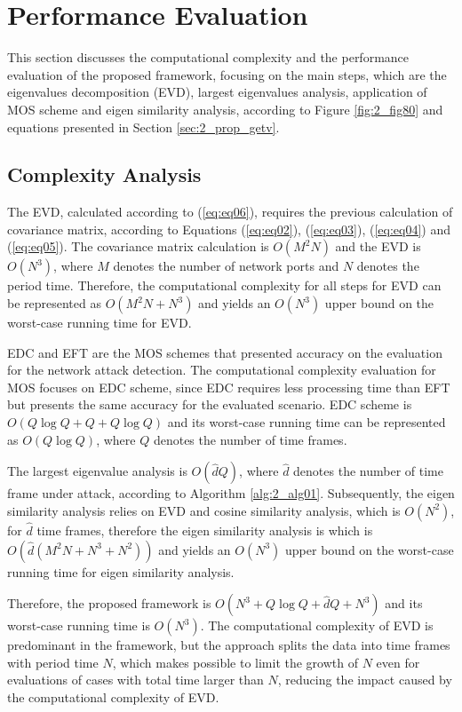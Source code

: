 \section{Performance Evaluation}
\label{sec:2_Complexity}

This section discusses the computational complexity and the performance evaluation of the proposed framework, focusing on the main steps, which are the eigenvalues decomposition (EVD), largest eigenvalues analysis, application of MOS scheme and eigen similarity analysis, according to Figure \ref{fig:2_fig80} and equations presented in Section \ref{sec:2_prop_getv}.

\subsection{Complexity Analysis}
\label{sec:2_ComplexityAnalysis}
The EVD, calculated according to (\ref{eq:eq06}), requires the previous calculation of covariance matrix, according to Equations (\ref{eq:eq02}), (\ref{eq:eq03}), (\ref{eq:eq04}) and (\ref{eq:eq05}). The covariance matrix calculation is $O(M^2N)$ and the EVD is $O(N^3)$, where $M$ denotes the number of network ports and $N$ denotes the period time. Therefore, the computational complexity for all steps for EVD can be represented as $O(M^2N + N^3)$ and yields an $O(N^3)$ upper bound on the worst-case running time for EVD.

EDC and EFT are the MOS schemes that presented accuracy on the evaluation for the network attack detection. The computational complexity evaluation for MOS focuses on EDC scheme, since EDC requires less processing time than EFT but presents the same accuracy for the evaluated scenario. EDC scheme is $O(Q \log Q + Q + Q \log Q)$ and its worst-case running time can be represented as $O(Q \log Q)$, where $Q$ denotes the number of time frames.

The largest eigenvalue analysis is $O(\hat{d}Q)$, where $\hat{d}$ denotes the number of time frame under attack, according to Algorithm \ref{alg:2_alg01}. Subsequently, the eigen similarity analysis relies on EVD and cosine similarity analysis, which is $O(N^2)$, for $\hat{d}$ time frames, therefore the eigen similarity analysis is which is $O(\hat{d}(M^2N + N^3 + N^2))$ and yields an $O(N^3)$ upper bound on the worst-case running time for eigen similarity analysis.

Therefore, the proposed framework is $O(N^3 + Q \log Q + \hat{d}Q + N^3)$ and its worst-case running time is $O(N^3)$. The computational complexity of EVD is predominant in the framework, but the approach splits the data into time frames with period time $N$, which makes possible to limit the growth of $N$ even for evaluations of cases with total time larger than $N$, reducing the impact caused by the computational complexity of EVD.

